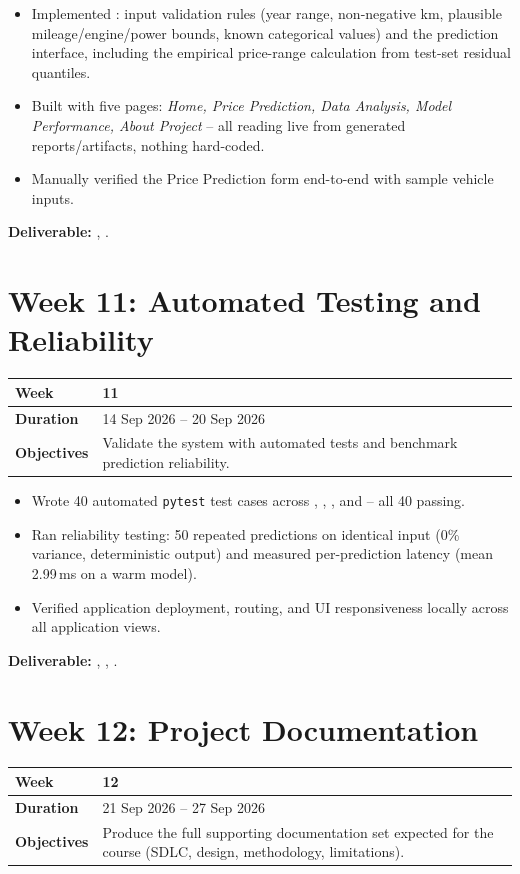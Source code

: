 \documentclass[12pt,a4paper]{report}
\newcommand{\weektable}[3]{%
\begin{longtable}{|p{3.6cm}|p{10.5cm}|}
\hline
\textbf{Week} & \textbf{#1} \\
\hline
\textbf{Duration} & #2 \\
\hline
\textbf{Objectives} & #3 \\
\hline
\end{longtable}
}
\begin{document}
\begin{itemize}[nosep]
    \item Implemented : input validation rules (year range, non-negative km, plausible mileage/engine/power bounds, known categorical values) and the prediction interface, including the empirical price-range calculation from test-set residual quantiles.
    \item Built  with five pages: \textit{Home, Price Prediction, Data Analysis, Model Performance, About Project} -- all reading live from generated reports/artifacts, nothing hard-coded.
    \item Manually verified the Price Prediction form end-to-end with sample vehicle inputs.
\end{itemize}
\textbf{Deliverable:} , .

\chapter{Week 11: Automated Testing and Reliability}
\weektable{11}{14 Sep 2026 -- 20 Sep 2026}{Validate the system with automated tests and benchmark prediction reliability.}

\begin{itemize}[nosep]
    \item Wrote 40 automated \texttt{pytest} test cases across , , , and  -- all 40 passing.
    \item Ran reliability testing: 50 repeated predictions on identical input (0\% variance, deterministic output) and measured per-prediction latency (mean 2.99\,ms on a warm model).
    \item Verified application deployment, routing, and UI responsiveness locally across all application views.
\end{itemize}
\textbf{Deliverable:} , , .

\chapter{Week 12: Project Documentation}
\weektable{12}{21 Sep 2026 -- 27 Sep 2026}{Produce the full supporting documentation set expected for the course (SDLC, design, methodology, limitations).}
\end{document}
